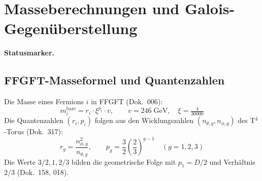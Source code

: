 
\providecommand{\BM}{\textbf{[B]}}
\providecommand{\KM}{\textbf{[K]}}
\providecommand{\SM}{\textbf{[S]}}

\chapter*{Masseberechnungen und Galois-Gegenüberstellung}

\begin{abstract}
Dieses Dokument stellt die FFGFT-Masseberechnungen der drei Leptonengenerationen
den entsprechenden Galois-Strukturen in GF$(3^n)$ gegenüber.

Das Hauptergebnis: $(m_\mu/m_e)^2 = 43200$ ist in beiden Frameworks exakt und
identisch — FFGFT aus Quantenzahlen $(r_i, p_i)$, Galois aus Gruppenordnungen
$|\text{GF}(9)^*|^2 \cdot 5^2 \cdot |\text{GF}(27)|$. Die Gleichheit ist keine
numerische Koinzidenz, sondern eine algebraische Identität, aus der $\xi = 4/30000$
als Galois-Zahl folgt~\KM.

Die verbleibende Abweichung der bare-Massen vom Experiment (~0.5\%) ist weder
ein Mess\-fehler noch $K_\text{frak}$; sie ist eine empirische Diskrepanz.
Kandidat ist die fraktal-rekursive Korrektur höherer Ordnung der
Torus-Wicklungszahlen; die physikalische Zuordnung ist offen.
Prüfskripte: \texttt{pruef\_330}, \texttt{pruef\_331}.
\end{abstract}
\medskip\noindent\textbf{Statusmarker.}



\section{FFGFT-Masseformel und Quantenzahlen}

Die Masse eines Fermions $i$ in FFGFT (Dok.~006):
\begin{equation}
  m_i^{\text{bare}} = r_i \cdot \xi^{p_i} \cdot v,
  \qquad v = 246\;\text{GeV},\quad \xi = \tfrac{4}{30000}
\end{equation}
Die Quantenzahlen $(r_i, p_i)$ folgen aus den Wicklungszahlen
$(n_{\theta,g}, n_{\phi,g})$ des T$^4$-Torus (Dok.~317):
\begin{equation}
  r_g = \frac{n_{\phi,g}^2}{n_{\theta,g}},
  \qquad p_g = \frac{3}{2}\left(\frac{2}{3}\right)^{g-1}
  \quad (g = 1, 2, 3)
\end{equation}
Die Werte $3/2, 1, 2/3$ bilden die geometrische Folge mit $p_1 = D/2$ und
Verhältnis $2/3$ (Dok.~158, 018).

